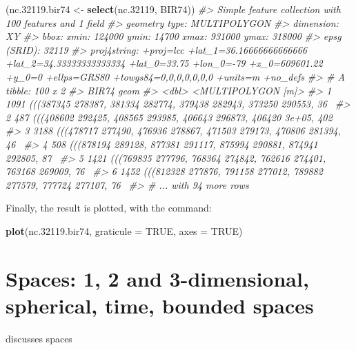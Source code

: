\documentclass[]{krantz}
\newenvironment{Shaded}{\begin{snugshade}}{\end{snugshade}}
\newcommand{\KeywordTok}[1]{\textcolor[rgb]{0.13,0.29,0.53}{\textbf{#1}}}
\newcommand{\DataTypeTok}[1]{\textcolor[rgb]{0.13,0.29,0.53}{#1}}
\newcommand{\FloatTok}[1]{\textcolor[rgb]{0.00,0.00,0.81}{#1}}
\newcommand{\StringTok}[1]{\textcolor[rgb]{0.31,0.60,0.02}{#1}}
\newcommand{\CommentTok}[1]{\textcolor[rgb]{0.56,0.35,0.01}{\textit{#1}}}
\newcommand{\OtherTok}[1]{\textcolor[rgb]{0.56,0.35,0.01}{#1}}
\newcommand{\NormalTok}[1]{#1}
\theoremstyle{definition}
\theoremstyle{definition}
\theoremstyle{definition}
\theoremstyle{remark}
\begin{document}
\begin{Shaded}
\begin{Highlighting}[]
\NormalTok{(nc.}\FloatTok{32119.}\NormalTok{bir74 <-}\StringTok{ }\KeywordTok{select}\NormalTok{(nc}\FloatTok{.32119}\NormalTok{, BIR74))}
\CommentTok{#> Simple feature collection with 100 features and 1 field}
\CommentTok{#> geometry type:  MULTIPOLYGON}
\CommentTok{#> dimension:      XY}
\CommentTok{#> bbox:           xmin: 124000 ymin: 14700 xmax: 931000 ymax: 318000}
\CommentTok{#> epsg (SRID):    32119}
\CommentTok{#> proj4string:    +proj=lcc +lat_1=36.16666666666666 +lat_2=34.33333333333334 +lat_0=33.75 +lon_0=-79 +x_0=609601.22 +y_0=0 +ellps=GRS80 +towgs84=0,0,0,0,0,0,0 +units=m +no_defs}
\CommentTok{#> # A tibble: 100 x 2}
\CommentTok{#>   BIR74                                                               geom}
\CommentTok{#>   <dbl>                                                 <MULTIPOLYGON [m]>}
\CommentTok{#> 1  1091 (((387345 278387, 381334 282774, 379438 282943, 373250 290553, 36~}
\CommentTok{#> 2   487 (((408602 292425, 408565 293985, 406643 296873, 406420 3e+05, 402~}
\CommentTok{#> 3  3188 (((478717 277490, 476936 278867, 471503 279173, 470806 281394, 46~}
\CommentTok{#> 4   508 (((878194 289128, 877381 291117, 875994 290881, 874941 292805, 87~}
\CommentTok{#> 5  1421 (((769835 277796, 768364 274842, 762616 274401, 763168 269009, 76~}
\CommentTok{#> 6  1452 (((812328 277876, 791158 277012, 789882 277579, 777724 277107, 76~}
\CommentTok{#> # ... with 94 more rows}
\end{Highlighting}
\end{Shaded}

Finally, the result is plotted, with the command:

\begin{Shaded}
\begin{Highlighting}[]
\KeywordTok{plot}\NormalTok{(nc.}\FloatTok{32119.}\NormalTok{bir74, }\DataTypeTok{graticule =} \OtherTok{TRUE}\NormalTok{, }\DataTypeTok{axes =} \OtherTok{TRUE}\NormalTok{)}
\end{Highlighting}
\end{Shaded}

\section{Spaces: 1, 2 and 3-dimensional, spherical, time, bounded
spaces}\label{spaces-1-2-and-3-dimensional-spherical-time-bounded-spaces}

discusses spaces
\end{document}

